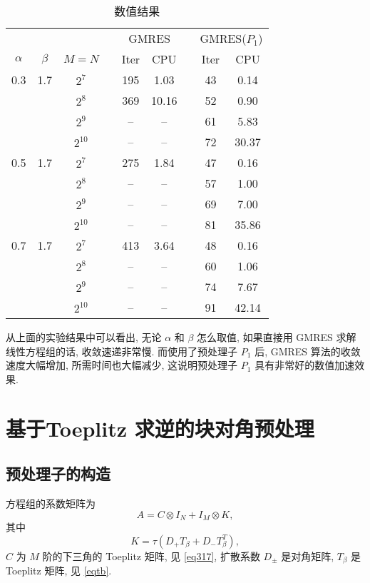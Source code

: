 \documentclass{ecnumaster}
\begin{document}
\begin{table}[H] %
\centering %
\caption{数值结果} \label{tab33412}\smallskip %
\begin{tabular}{ccccccccc} \toprule
& &  && \multicolumn{2}{c}{GMRES} && \multicolumn{2}{c}{GMRES($P_1$)} \\
$\alpha$ & $\beta$ & $M = N$ && Iter & CPU && Iter & CPU\\ \midrule
0.3 &1.7
 & $2^7$    && 195 &1.03  && 43 &0.14  \\
&& $2^8$    && 369 &10.16 && 52 &0.90  \\
&& $2^9$    && --  &--    && 61 &5.83  \\
&& $2^{10}$ && --  &--    && 72 &30.37 \\\midrule
0.5 &1.7
 & $2^7$    && 275 &1.84  && 47 &0.16  \\
&& $2^8$    && --  &--    && 57 &1.00  \\
&& $2^9$    && --  &--    && 69 &7.00  \\
&& $2^{10}$ && --  &--    && 81 &35.86 \\\midrule
0.7 &1.7
 & $2^7$    && 413 &3.64  && 48 &0.16  \\
&& $2^8$    && --  &--    && 60 &1.06  \\
&& $2^9$    && --  &--    && 74 &7.67  \\
&& $2^{10}$ && --  &--    && 91 &42.14 \\\bottomrule
\end{tabular}
\end{table}

从上面的实验结果中可以看出,
无论 $\alpha$ 和 $\beta$ 怎么取值,
如果直接用 GMRES 求解线性方程组的话, 收敛速递非常慢.
而使用了预处理子 $P_1$ 后, GMRES 算法的收敛速度大幅增加, 所需时间也大幅减少,
这说明预处理子 $P_1$ 具有非常好的数值加速效果.

\section{基于Toeplitz 求逆的块对角预处理}
\subsection{预处理子的构造}
方程组的系数矩阵为
$$
  A = C \otimes I_N + I_M \otimes K,
$$
其中
$$
  K = \tau (D_+T_{\beta} + D_-T_{\beta}^T),
$$
$C$ 为 $M$ 阶的下三角的 Toeplitz 矩阵, 见 \eqref{eq317},
扩散系数 $D_{\pm}$ 是对角矩阵,
$T_{\beta}$ 是 Toeplitz 矩阵, 见 \eqref{eqtb}.
\end{document}

